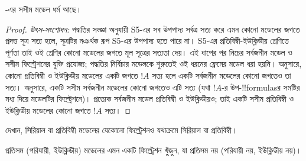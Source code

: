 \documentclass[../../../include/open-logic-section]{subfiles}
\begin{document}
\begin{cor}
  -এর সসীম মডেল ধর্ম আছে।
\end{cor}

\begin{proof}
  \emph{উৎস-সংশোধন:} পদ্ধতির সংজ্ঞা অনুযায়ী S5-এর সব উপপাদ্য সর্বত্র সত্য করে এমন কোনো মডেলের জগতে প্রদত্ত সূত্র সত্য হলে, সূত্রটির নঞর্থক রূপ S5-এর উপপাদ্য হতে পারে না। S5-এর প্রতিবিম্বী-ইউক্লিডীয় শ্রেণিতে পূর্ণতা তাই ওই শ্রেণির কোনো মডেলের জগতে মূল সূত্রের সত্যতা দেয়। এই ধাপের পর নিচের সর্বজনীন মডেল ও সসীম ফিল্ট্রেশনের যুক্তি প্রযোজ্য; পদ্ধতির নির্বিচার মডেলকে শুরুতেই ওই ধরনের ফ্রেমের মডেল ধরা হয়নি।
     অনুসারে, কোনো প্রতিবিম্বী ও ইউক্লিডীয় মডেলের একটি জগতে $!A$ সত্য হলে একটি সর্বজনীন মডেলের কোনো জগতেও তা সত্য।  অনুসারে, একটি সসীম সর্বজনীন মডেলের কোনো জগতেও এটি সত্য (যথা $!A$-র উপ-!!{formula}sর সমষ্টির মধ্য দিয়ে মডেলটির ফিল্ট্রেশনে)। প্রত্যেক সর্বজনীন মডেল প্রতিবিম্বী ও ইউক্লিডীয়ও; তাই একটি সসীম প্রতিবিম্বী ও ইউক্লিডীয় মডেলের কোনো জগতে $!A$ সত্য।
\end{proof}

\begin{prob}
  দেখান, সিরিয়াল বা প্রতিবিম্বী মডেলের যেকোনো ফিল্ট্রেশনও যথাক্রমে সিরিয়াল বা প্রতিবিম্বী।
\end{prob}

\begin{prob}
  প্রতিসম (পরিযায়ী, ইউক্লিডীয়) মডেলের এমন একটি ফিল্ট্রেশন খুঁজুন, যা প্রতিসম নয় (পরিযায়ী নয়, ইউক্লিডীয় নয়)।
\end{prob}
\end{document}
